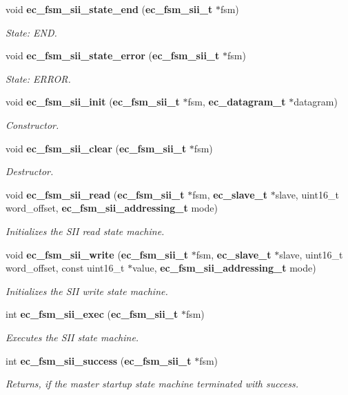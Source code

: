 \begin{DoxyCompactItemize}
void {\bf ec\-\_\-fsm\-\_\-sii\-\_\-state\-\_\-end} ({\bf ec\-\_\-fsm\-\_\-sii\-\_\-t} $\ast$fsm)
\begin{DoxyCompactList}\small\item\em \-State\-: \-E\-N\-D. \end{DoxyCompactList}\item 
void {\bf ec\-\_\-fsm\-\_\-sii\-\_\-state\-\_\-error} ({\bf ec\-\_\-fsm\-\_\-sii\-\_\-t} $\ast$fsm)
\begin{DoxyCompactList}\small\item\em \-State\-: \-E\-R\-R\-O\-R. \end{DoxyCompactList}\item 
void {\bf ec\-\_\-fsm\-\_\-sii\-\_\-init} ({\bf ec\-\_\-fsm\-\_\-sii\-\_\-t} $\ast$fsm, {\bf ec\-\_\-datagram\-\_\-t} $\ast$datagram)
\begin{DoxyCompactList}\small\item\em \-Constructor. \end{DoxyCompactList}\item 
void {\bf ec\-\_\-fsm\-\_\-sii\-\_\-clear} ({\bf ec\-\_\-fsm\-\_\-sii\-\_\-t} $\ast$fsm)
\begin{DoxyCompactList}\small\item\em \-Destructor. \end{DoxyCompactList}\item 
void {\bf ec\-\_\-fsm\-\_\-sii\-\_\-read} ({\bf ec\-\_\-fsm\-\_\-sii\-\_\-t} $\ast$fsm, {\bf ec\-\_\-slave\-\_\-t} $\ast$slave, uint16\-\_\-t word\-\_\-offset, {\bf ec\-\_\-fsm\-\_\-sii\-\_\-addressing\-\_\-t} mode)
\begin{DoxyCompactList}\small\item\em \-Initializes the \-S\-I\-I read state machine. \end{DoxyCompactList}\item 
void {\bf ec\-\_\-fsm\-\_\-sii\-\_\-write} ({\bf ec\-\_\-fsm\-\_\-sii\-\_\-t} $\ast$fsm, {\bf ec\-\_\-slave\-\_\-t} $\ast$slave, uint16\-\_\-t word\-\_\-offset, const uint16\-\_\-t $\ast$value, {\bf ec\-\_\-fsm\-\_\-sii\-\_\-addressing\-\_\-t} mode)
\begin{DoxyCompactList}\small\item\em \-Initializes the \-S\-I\-I write state machine. \end{DoxyCompactList}\item 
int {\bf ec\-\_\-fsm\-\_\-sii\-\_\-exec} ({\bf ec\-\_\-fsm\-\_\-sii\-\_\-t} $\ast$fsm)
\begin{DoxyCompactList}\small\item\em \-Executes the \-S\-I\-I state machine. \end{DoxyCompactList}\item 
int {\bf ec\-\_\-fsm\-\_\-sii\-\_\-success} ({\bf ec\-\_\-fsm\-\_\-sii\-\_\-t} $\ast$fsm)
\begin{DoxyCompactList}\small\item\em \-Returns, if the master startup state machine terminated with success. \end{DoxyCompactList}\end{DoxyCompactItemize}


